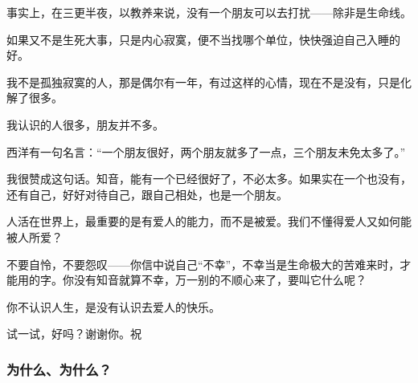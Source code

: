 \par {}
\par 事实上，在三更半夜，以教养来说，没有一个朋友可以去打扰——除非是生命线。
\par 如果又不是生死大事，只是内心寂寞，便不当找哪个单位，快快强迫自己入睡的好。
\par 我不是孤独寂寞的人，那是偶尔有一年，有过这样的心情，现在不是没有，只是化解了很多。
\par 我认识的人很多，朋友并不多。
\par 西洋有一句名言：“一个朋友很好，两个朋友就多了一点，三个朋友未免太多了。”
\par 我很赞成这句话。知音，能有一个已经很好了，不必太多。如果实在一个也没有，还有自己，好好对待自己，跟自己相处，也是一个朋友。
\par 人活在世界上，最重要的是有爱人的能力，而不是被爱。我们不懂得爱人又如何能被人所爱？
\par 不要自怜，不要怨叹——你信中说自己“不幸”，不幸当是生命极大的苦难来时，才能用的字。你没有知音就算不幸，万一别的不顺心来了，要叫它什么呢？
\par 你不认识人生，是没有认识去爱人的快乐。
\par 试一试，好吗？谢谢你。祝
\par {}
\par {}


\subsubsection{为什么、为什么？}


